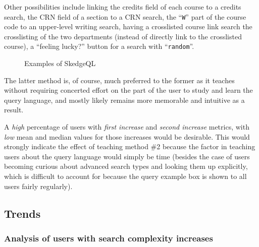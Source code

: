 {\begin{enumerate}
{  Other possibilities include linking the credits field of each course to a credits search, the CRN field of a section to a CRN search, the ``{\tt W}'' part of the course code to an upper-level writing search, having a crosslisted course link search the crosslisting of the two departments (instead of directly link to the crosslisted course), a ``feeling lucky?'' button for a search with ``{\tt random}''.}
\end{enumerate}

\begin{figure}[H]
  \centering
  \caption{Examples of SkedgeQL} \label{fig:sk-search2}
\end{figure}

\noindent The latter method is, of course, much preferred to the former as it teaches without requiring concerted effort on the part of the user to study and learn the query language, and mostly likely remains more memorable and intuitive as a result.

A \emph{high} percentage of users with \emph{first increase} and \emph{second increase} metrics, with \emph{low} mean and median values for those increases would be desirable. This would strongly indicate the effect of teaching method \#2 because the factor in teaching users about the query language would simply be time (besides the case of users becoming curious about advanced search types and looking them up explicitly, which is difficult to account for because the query example box is shown to all users fairly regularly).

\subsection{Trends}

\subsubsection{Analysis of users with search complexity increases}

}
